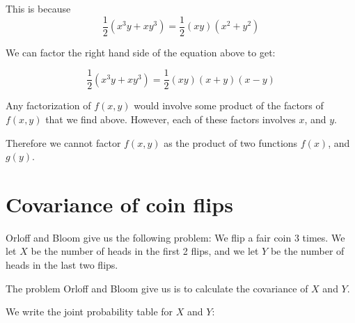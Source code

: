 \documentclass[a4paper,11pt]{article}
\begin{document}
This is because
\begin{equation}
\frac{1}{2}\left(x^3y + xy^3 \right)
 = \frac{1}{2}\left(xy\right) \left(x^2 + y^2 \right)
\end{equation}

We can factor the right hand side of the equation above
to get:

\begin{equation}
\frac{1}{2}\left(x^3y + xy^3 \right)
 = \frac{1}{2}\left(xy\right) \left(x + y\right)\left(x - y \right)
\end{equation}

Any factorization of $f\left(x, y\right)$ would involve
some product of the factors of $f\left(x, y\right)$ that
we find above.  However, each of these factors involves
$x$, and $y$.

Therefore we cannot factor $f\left( x, y \right)$ as
the product of two functions $f\left(x \right)$, and
$g\left(y \right)$.

\section{Covariance of coin flips}

Orloff and Bloom give us the following problem:
We flip a fair coin 3 times.  We let $X$ be the
number of heads in the first 2 flips, and we
let $Y$ be the number of heads in the last two flips.

The problem Orloff and Bloom give us is to calculate
the covariance of $X$ and $Y$.

We write the joint probability table for $X$ and $Y$:
\end{document}
